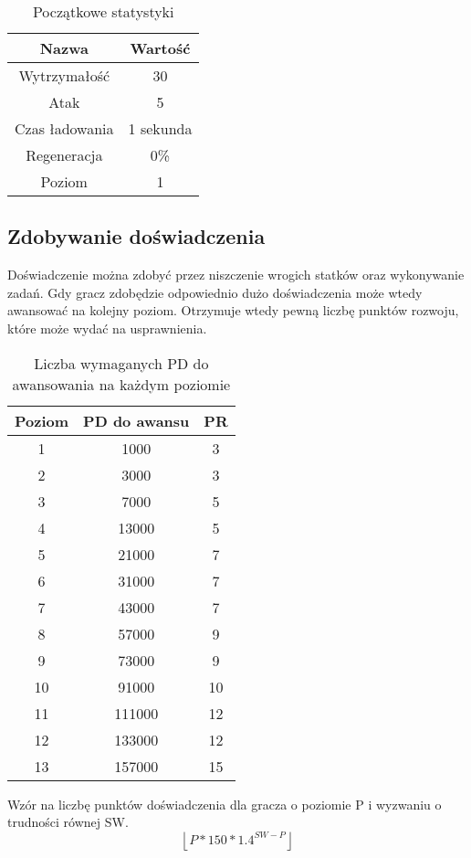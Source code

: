 \begin{table}[h]
\centering
\begin{tabular}{ | c | c | }
\hline
\textbf{Nazwa} & \textbf{Wartość} \\ \hline
Wytrzymałość & 30 \\ \hline
Atak & 5 \\ \hline
Czas ładowania & 1 sekunda \\ \hline
Regeneracja & 0\% \\ \hline
Poziom & 1 \\ \hline
\end{tabular}
\caption{Początkowe statystyki}
\end{table}

\subsection{Zdobywanie doświadczenia}
Doświadczenie można zdobyć przez niszczenie wrogich statków oraz wykonywanie zadań. Gdy gracz zdobędzie odpowiednio dużo doświadczenia może wtedy awansować na kolejny poziom. Otrzymuje wtedy pewną liczbę punktów rozwoju, które może wydać na usprawnienia.

\begin{table}[h]
\centering
\begin{tabular}{ | c | c | c | }
\hline
\textbf{Poziom} & \textbf{PD do awansu} & \textbf{PR} \\
\hline
1 & 1000 & 3 \\
2 & 3000 & 3 \\
3 & 7000 & 5 \\
4 & 13000 & 5 \\
5 & 21000 & 7 \\
6 & 31000 & 7 \\
7 & 43000 & 7 \\
8 & 57000 & 9 \\
9 & 73000 & 9 \\
10 & 91000 & 10 \\
11 & 111000 & 12 \\
12 & 133000 & 12 \\
13 & 157000 & 15 \\
\hline

\end{tabular}
\caption{Liczba wymaganych PD do awansowania na każdym poziomie}
\end{table}

Wzór na liczbę punktów doświadczenia dla gracza o poziomie P i wyzwaniu o trudności równej SW.
\begin{equation}
\left \lfloor P*150*1.4^{SW-P} \right \rfloor
\end{equation}

